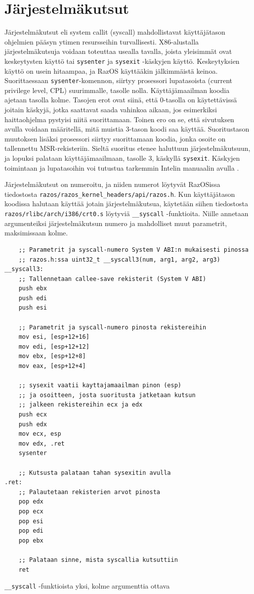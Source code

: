 \section{Järjestelmäkutsut}

Järjestelmäkutsut eli system callit (syscall) mahdollistavat käyttäjätason ohjelmien pääsyn ytimen resursseihin turvallisesti. X86-alustalla järjestelmäkutsuja voidaan toteuttaa usealla tavalla, joista yleisimmät ovat keskeytysten käyttö tai \texttt{sysenter} ja \texttt{sysexit} -käskyjen käyttö. Keskeytyksien käyttö on usein hitaampaa, ja RazOS käyttääkin jälkimmäistä keinoa. Suorittaessaan \texttt{sysenter}-komennon, siirtyy prosessori lupatasoista (current privilege level, CPL) suurimmalle, tasolle nolla. Käyttäjämaailman koodia ajetaan tasolla kolme. Tasojen erot ovat siinä, että 0-tasolla on käytettävissä joitain käskyjä, jotka saattavat saada vahinkoa aikaan, jos esimerkiksi haittaohjelma pystyisi niitä suorittamaan. Toinen ero on se, että sivutuksen avulla voidaan määritellä, mitä muistia 3-tason koodi saa käyttää. Suoritustason muutoksen lisäksi prosessori siirtyy suorittamaan koodia, jonka osoite on tallennettu MSR-rekisteriin. Sieltä suoritus etenee haluttuun järjestelmäkutsuun, ja lopuksi palataan käyttäjämaailmaan, tasolle 3, käskyllä \texttt{sysexit}.  Käskyjen toimintaan ja lupatasoihin voi tutustua tarkemmin Intelin manuaalin avulla \parencite{INTEL_MAN}.

\par

Järjestelmäkutsut on numeroitu, ja niiden numerot löytyvät RazOSissa tiedostosta \texttt{razos/razos\_kernel\_headers/api/razos.h}. Kun käyttäjätason koodissa halutaan käyttää jotain järjestelmäkutsua, käytetään siihen tiedostosta \texttt{razos/rlibc/arch/i386/crt0.s} löytyviä \texttt{\_\_syscall} -funktioita. Niille annetaan argumenteiksi järjestelmäkutsun numero ja mahdolliset muut parametrit, maksimissaan kolme.

\begin{listing}[H]
\begin{verbatim}
    ;; Parametrit ja syscall-numero System V ABI:n mukaisesti pinossa
    ;; razos.h:ssa uint32_t __syscall3(num, arg1, arg2, arg3)
__syscall3:
    ;; Tallennetaan callee-save rekisterit (System V ABI)
    push ebx
    push edi
    push esi

    ;; Parametrit ja syscall-numero pinosta rekistereihin
    mov esi, [esp+12+16]
    mov edi, [esp+12+12]
    mov ebx, [esp+12+8]
    mov eax, [esp+12+4]

    ;; sysexit vaatii kayttajamaailman pinon (esp)
    ;; ja osoitteen, josta suoritusta jatketaan kutsun
    ;; jalkeen rekistereihin ecx ja edx
    push ecx
    push edx
    mov ecx, esp
    mov edx, .ret
    sysenter

    ;; Kutsusta palataan tahan sysexitin avulla
.ret:
    ;; Palautetaan rekisterien arvot pinosta
    pop edx
    pop ecx
    pop esi
    pop edi
    pop ebx

    ;; Palataan sinne, mista syscallia kutsuttiin
    ret
\end{verbatim}
\caption{\texttt{\_\_syscall} -funktioista yksi, kolme argumenttia ottava}
\label{lst:syscall3}
\end{listing}

